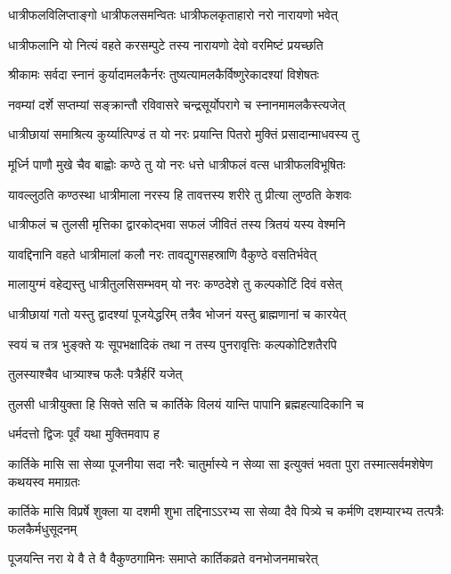 \twolineshloka
{धात्रीफलविलिप्ताङ्गो धात्रीफलसमन्वितः}
{धात्रीफलकृताहारो नरो नारायणो भवेत्} %

\twolineshloka
{धात्रीफलानि यो नित्यं वहते करसम्पुटे}
{तस्य नारायणो देवो वरमिष्टं प्रयच्छति} %

\twolineshloka
{श्रीकामः सर्वदा स्नानं कुर्यादामलकैर्नरः}
{तुष्यत्यामलकैर्विष्णुरेकादश्यां विशेषतः} %

\twolineshloka
{नवम्यां दर्शे सप्तम्यां सङ्क्रान्तौ रविवासरे}
{चन्द्रसूर्योपरागे च स्नानमामलकैस्त्यजेत्} %

\twolineshloka
{धात्रीछायां समाश्रित्य कुर्य्यात्पिण्डं त यो नरः}
{प्रयान्ति पितरो मुक्तिं प्रसादान्माधवस्य तु} %

\twolineshloka
{मूर्ध्नि पाणौ मुखे चैव बाह्वोः कण्ठे तु यो नरः}
{धत्ते धात्रीफलं वत्स धात्रीफलविभूषितः} %

\twolineshloka
{यावल्लुठति कण्ठस्था धात्रीमाला नरस्य हि}
{तावत्तस्य शरीरे तु प्रीत्या लुण्ठति केशवः} %

\twolineshloka
{धात्रीफलं च तुलसी मृत्तिका द्वारकोद्भवा}
{सफलं जीवितं तस्य त्रितयं यस्य वेश्मनि} %


\twolineshloka
{यावद्दिनानि वहते धात्रीमालां कलौ नरः}
{तावद्युगसहस्राणि वैकुण्ठे वसतिर्भवेत्} %

\twolineshloka
{मालायुग्मं वहेद्यस्तु धात्रीतुलसिसम्भवम्}
{यो नरः कण्ठदेशे तु कल्पकोटिं दिवं वसेत्} %

\twolineshloka
{धात्रीछायां गतो यस्तु द्वादश्यां पूजयेद्धरिम्}
{तत्रैव भोजनं यस्तु ब्राह्मणानां च कारयेत्} %

\twolineshloka
{स्वयं च तत्र भुङ्क्ते यः सूपभक्षादिकं तथा}
{न तस्य पुनरावृत्तिः कल्पकोटिशतैरपि} %


\onelineshloka
{तुलस्याश्चैव धात्र्याश्च फलैः पत्रैर्हरिं यजेत्} %

\twolineshloka
{तुलसी धात्रीयुक्ता हि सिक्ते सति च कार्तिके}
{विलयं यान्ति पापानि ब्रह्महत्यादिकानि च} %


\onelineshloka
{धर्मदत्तो द्विजः पूर्वं यथा मुक्तिमवाप ह} %


\threelineshloka
{कार्तिके मासि सा सेव्या पूजनीया सदा नरैः}
{चातुर्मास्ये न सेव्या सा इत्युक्तं भवता पुरा}
{तस्मात्सर्वमशेषेण कथयस्व ममाग्रतः} %


\threelineshloka
{कार्तिके मासि विप्रर्षे शुक्ला या दशमी शुभा}
{तद्दिनाऽऽरभ्य सा सेव्या दैवे पित्र्ये च कर्मणि}
{दशम्यारभ्य तत्पत्रैः फलकैर्मधुसूदनम्} %

\twolineshloka
{पूजयन्ति नरा ये वै ते वै वैकुण्ठगामिनः}
{समाप्ते कार्तिकव्रते वनभोजनमाचरेत्} %

